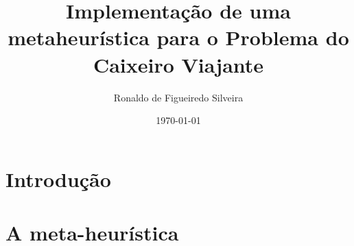 \documentclass[a4paper]{article}
\title{Implementação de uma metaheurística para o Problema do Caixeiro Viajante}
\author{Ronaldo de Figueiredo Silveira }
\date{\today}
\begin{document}
	\maketitle
    
    
    
    
    \section{Introdução}
    	
    	
    \section{A meta-heurística}
	    
        
    
    
\end{document}
